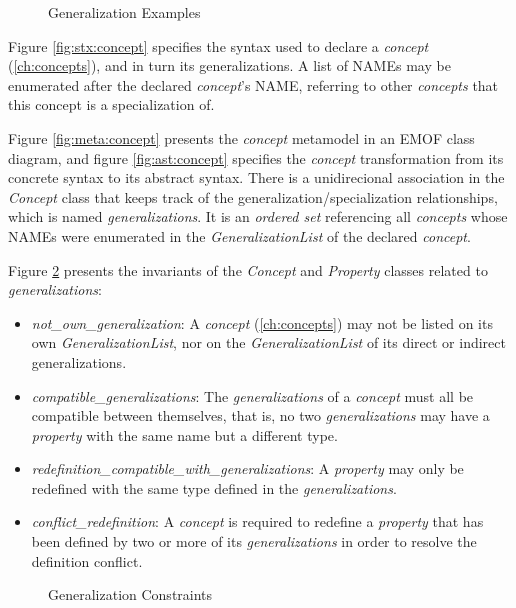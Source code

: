 \begin{figure}
\verbatimfont{\small}

\caption{Generalization Examples}
\label{fig:ex:generalization}
\end{figure}

\begin{concrete-syntax}
Figure \ref{fig:stx:concept} specifies the syntax used
to declare a \emph{concept} (\ref{ch:concepts}),
and in turn its generalizations.
A list of NAMEs may be enumerated after the declared \emph{concept}'s NAME,
referring to other \emph{concepts} that this concept is a specialization of.
\end{concrete-syntax}

\begin{abstract-syntax}
Figure \ref{fig:meta:concept} presents the \emph{concept} metamodel
in an EMOF \cite{mof} class diagram,
and figure \ref{fig:ast:concept} specifies
the \emph{concept} transformation
from its concrete syntax to its abstract syntax.
There is a unidirecional association in the \emph{Concept} class
that keeps track of the generalization/specialization relationships,
which is named \emph{generalizations}.
It is an \emph{ordered set} referencing all \emph{concepts}
whose NAMEs were enumerated in the \emph{GeneralizationList}
of the declared \emph{concept}.
\end{abstract-syntax}

\begin{constraints}
Figure \ref{fig:ocl:generalization} presents the invariants
of the \emph{Concept} and \emph{Property} classes
related to \emph{generalizations}:

\begin{itemize}

\item \emph{not\_own\_generalization}:
A \emph{concept} (\ref{ch:concepts}) may not be listed on its own \emph{GeneralizationList},
nor on the \emph{GeneralizationList} of its direct or indirect generalizations.

\item \emph{compatible\_generalizations}:
The \emph{generalizations} of a \emph{concept} must all be compatible between themselves,
that is, no two \emph{generalizations} may have a \emph{property} with the same name
but a different type.

\item \emph{redefinition\_compatible\_with\_generalizations}:
A \emph{property} may only be redefined with the same type defined in the \emph{generalizations}.

\item \emph{conflict\_redefinition}:
A \emph{concept} is required to redefine a \emph{property} that 
has been defined by two or more of its \emph{generalizations}
in order to resolve the definition conflict.

\end{itemize}
\end{constraints}

\begin{figure}

\caption{Generalization Constraints}
\label{fig:ocl:generalization}
\end{figure}
